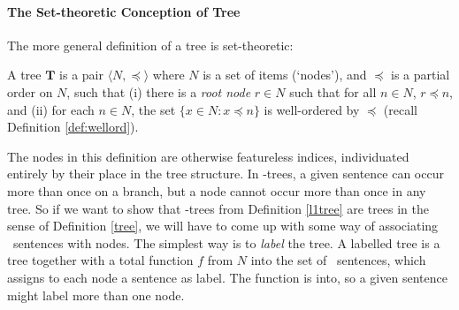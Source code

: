 \paragraph{The Set-theoretic Conception of Tree}
 The more general definition of a tree is  set-theoretic: 
\begin{definition}\label{tree}
	A tree $\mathbf{T}$ is a pair $\langle N, \preceq\rangle$ where $N$ is a set of items (`nodes'), and $\preceq$ is a partial order on $N$, such that (i) there is a \emph{root node} $r \in N$ such that for all $n\in N$, $r \preceq n$, and (ii) for each $n \in N$, the set $\{x \in N: x \preceq n\}$ is well-ordered by $\preceq$ (recall Definition \ref{def:wellord}). 
\end{definition} The nodes in this definition are otherwise featureless indices, individuated entirely by their place in the tree structure. In \lone-trees, a given sentence can occur more than once on a branch, but a node cannot occur more than once in any tree. So if we want to show that \lone-trees from Definition \ref{l1tree} are trees in the sense of Definition \ref{tree}, we will have to come up with some way of associating \lone\ sentences with nodes. The simplest way is to \emph{label} the tree. A labelled tree is a tree together with a total function $f$ from $N$ into the set of \lone\ sentences, which assigns to each node a sentence as label. The function is into, so a given sentence might label more than one node.

